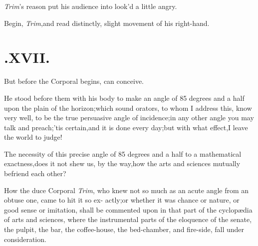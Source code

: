 \documentclass{article}
\begin{document}
\textit{Trim}’s reason put his audience into
look’d a little angry.

Begin, \textit{Trim},\tsh and read distinctly, 
slight movement of his right-hand.

\null
\section{.\enspace  XVII.}

\quad\tsh But before the Corporal begins,
can conceive.

He stood before them with his body
to make an angle of 85 degrees and a half upon the
plain of the horizon;\tsh\break which sound orators, to whom I address
this, know very well, to be the true per\-suasive angle of
incidence;\tsk in any other angle you may talk and
preach;\tsk ’tis certain,\tsk and it is done every
day;\tsk\break but with what effect,\tsk I leave the world to
judge!

The necessity of this precise angle of 85 degrees and a half to
a mathematical exactness,\tsk does it not shew us, by the
way,\tsk how the arts and sciences mutually befriend each other?

How the duce Corporal \textit{Trim}, who\break
knew not so much as an acute angle\break
from an obtuse one, came to hit it so ex-
actly;\tsh or whether it was chance or nature, or good
sense or imitation, \etc\break shall be commented upon in that part of
the cyclopædia of arts and sciences, where the instrumental
parts of the eloquence of the senate, the pulpit, the bar, the
coffee-house, the bed-chamber, and fire-side, fall under
consideration.
\end{document}
